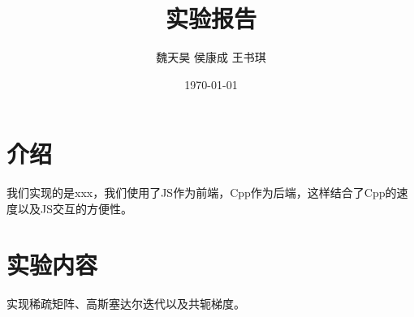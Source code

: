 \documentclass[UTF8]{ctexart}
\author{魏天昊 \quad 侯康成 \quad 王书琪}
\date{\today}
\title{实验报告}
\begin{document}
\maketitle
\tableofcontents

\section{介绍}
我们实现的是xxx，我们使用了JS作为前端，Cpp作为后端，这样结合了Cpp的速度以及JS交互的方便性。

\section{实验内容}
实现稀疏矩阵、高斯塞达尔迭代以及共轭梯度。

\end{document}

